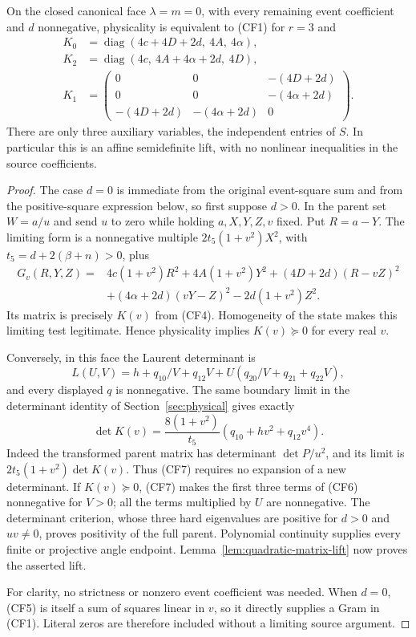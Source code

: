 \begin{theorem}
\label{thm:closed-face-adjacent}
On the closed canonical face $\lambda=m=0$, with every remaining
event coefficient and $d$ nonnegative, physicality is equivalent to
(CF1) for $r=3$ and
\begin{align*}
 K_0&=\operatorname{diag}(4c+4D+2d,\ 4A,\ 4\alpha),\\
 K_2&=\operatorname{diag}(4c,\ 4A+4\alpha+2d,\ 4D),\\
 K_1&=\begin{pmatrix}
 0&0&-(4D+2d)\\
 0&0&-(4\alpha+2d)\\
 -(4D+2d)&-(4\alpha+2d)&0
 \end{pmatrix}.                                           \tag{CF4}
\end{align*}
There are only three auxiliary variables, the independent entries of
$S$. In particular this is an affine semidefinite lift, with no
nonlinear inequalities in the source coefficients.
\end{theorem}
\begin{proof}
The case $d=0$ is immediate from the original event-square sum and
from the positive-square expression below, so first suppose $d>0$.
In the parent set $W=a/u$ and send $u$ to zero while holding
$a,X,Y,Z,v$ fixed. Put $R=a-Y$. The limiting form is a nonnegative
multiple $2t_5(1+v^2)X^2$, with
$t_5=d+2(\beta+n)>0$, plus
\[
 \begin{split}
 G_v(R,Y,Z)={}&4c(1+v^2)R^2+4A(1+v^2)Y^2
                  +(4D+2d)(R-vZ)^2\\
 &+(4\alpha+2d)(vY-Z)^2-2d(1+v^2)Z^2.
 \end{split}                                             \tag{CF5}
\]
Its matrix is precisely $K(v)$ from (CF4). Homogeneity of the state
makes this limiting test legitimate. Hence physicality implies
$K(v)\succeq0$ for every real $v$.

Conversely, in this face the Laurent determinant is
\[
 L(U,V)=h+q_{10}/V+q_{12}V
                   +U(q_{20}/V+q_{21}+q_{22}V),             \tag{CF6}
\]
and every displayed $q$ is nonnegative. The same boundary limit in
the determinant identity of Section~\ref{sec:physical} gives exactly
\[
 \det K(v)=\frac{8(1+v^2)}{t_5}
                (q_{10}+hv^2+q_{12}v^4).                  \tag{CF7}
\]
Indeed the transformed parent matrix has determinant
$\det P/u^2$, and its limit is
$2t_5(1+v^2)\det K(v)$. Thus (CF7) requires no expansion of a
new determinant. If $K(v)\succeq0$, (CF7) makes the first three
terms of (CF6) nonnegative for $V>0$; all the terms multiplied by
$U$ are nonnegative. The determinant criterion, whose three hard
eigenvalues are positive for $d>0$ and $uv\ne0$, proves positivity
of the full parent. Polynomial continuity supplies every finite or
projective angle endpoint. Lemma~\ref{lem:quadratic-matrix-lift}
now proves the asserted lift.

For clarity, no strictness or nonzero event coefficient was needed.
When $d=0$, (CF5) is itself a sum of squares linear in $v$, so it
directly supplies a Gram in (CF1). Literal zeros are therefore
included without a limiting source argument.
\end{proof}


